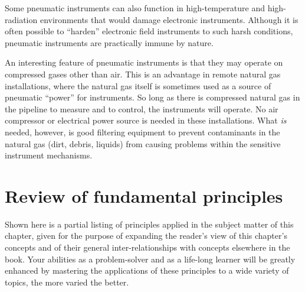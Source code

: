 Some pneumatic instruments can also function in high-temperature and high-radiation environments that would damage electronic instruments.  Although it is often possible to ``harden'' electronic field instruments to such harsh conditions, pneumatic instruments are practically immune by nature.

An interesting feature of pneumatic instruments is that they may operate on compressed gases other than air.  This is an advantage in remote natural gas installations, where the natural gas itself is sometimes used as a source of pneumatic ``power'' for instruments.  So long as there is compressed natural gas in the pipeline to measure and to control, the instruments will operate.  No air compressor or electrical power source is needed in these installations.  What \textit{is} needed, however, is good filtering equipment to prevent contaminants in the natural gas (dirt, debris, liquids) from causing problems within the sensitive instrument mechanisms.










\filbreak
\section{Review of fundamental principles}

Shown here is a partial listing of principles applied in the subject matter of this chapter, given for the purpose of expanding the reader's view of this chapter's concepts and of their general inter-relationships with concepts elsewhere in the book.  Your abilities as a problem-solver and as a life-long learner will be greatly enhanced by mastering the applications of these principles to a wide variety of topics, the more varied the better.

